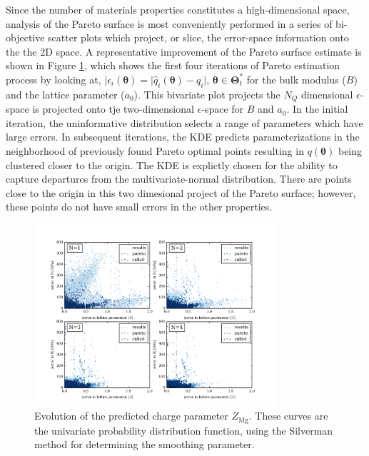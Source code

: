 Since the number of materials properties constitutes a high-dimensional space, analysis of the Pareto surface is most conveniently performed in a series of bi-objective scatter plots which project, or slice, the error-space information onto the the 2D space.  A representative improvement of the Pareto surface estimate is shown in Figure \ref{fig:MgO_biobjective_evolution}, which shows the first four iterations of Pareto estimation process by looking at,
$|\epsilon_i(\bm{\theta})=|\hat{q}_i(\bm{\theta})-q_i|$, $\bm{\theta}\in\bm{\Theta}_t^*$ for the bulk modulus ($B$) and the lattice parameter ($a_0$).  This bivariate plot projects the $N_Q$ dimensional $\epsilon$-space is projected onto tje two-dimensional $\epsilon$-space for $B$ and $a_0$. In the initial iteration, the uninformative distribution selects a range of parameters which have large errors.  In subsequent iterations, the KDE predicts parameterizations in the neighborhood of previously found Pareto optimal points resulting in $q(\bm{\theta})$ being clustered closer to the origin.   The KDE is explictly chosen for the ability to capture departures from the multivariate-normal distribution.  There are points close to the origin in this two dimesional project of the Pareto surface; however, these points do not have small errors in the other properties.

\begin{figure}[ht]
	\centering
  \includegraphics[width=0.8\textwidth]{chapter7/MgO_biobjective_evolution}
  \caption{Evolution of the predicted charge parameter $Z_{\text{Mg}}$.  These curves are the univariate probability distribution function, using the Silverman method for determining the smoothing parameter.}
  \label{fig:MgO_biobjective_evolution}
\end{figure}


